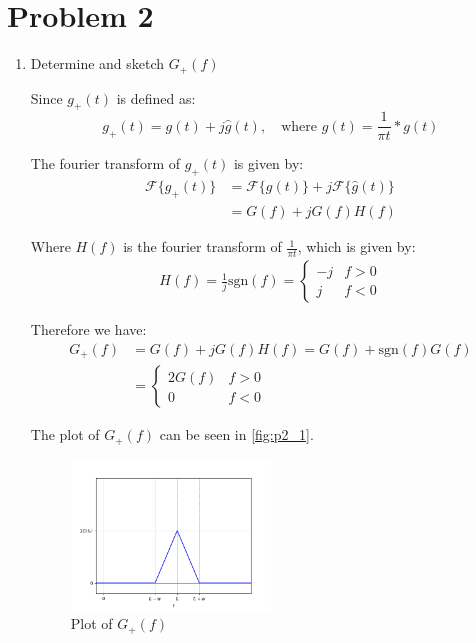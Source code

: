 \documentclass{article}
\begin{document}
\newpage
\newpage
\section{Problem 2}

\begin{enumerate}[label=2.\arabic*]
    \item Determine and sketch $G_+(f)$

    Since $g_+(t)$ is defined as:
    \[
        g_+(t) = g(t) + j\hat{g}(t), \quad \text{where } \hat{g}(t) = \frac{1}{\pi t} \ast g(t)
    \]

    The fourier transform of $g_+(t)$ is given by:
    \begin{align*}
        \mathcal{F}\{g_+(t)\} &= \mathcal{F}\{g(t)\} + j\mathcal{F}\{\hat{g}(t)\} \\
        &= G(f) + jG(f)H(f)
\end{align*}

Where $H(f)$ is the fourier transform of $\frac{1}{\pi t}$, which is given by:
\begin{align*}
    H(f) = \frac{1}{j} \text{sgn}(f) = \begin{cases}
        -j & f > 0 \\
        j & f < 0
    \end{cases}
\end{align*}

Therefore we have:
\begin{align*}
        G_+(f) &= G(f) + jG(f)H(f) = G(f) + \text{sgn}(f)G(f) \\
        &= \begin{cases}
            2G(f) & f > 0 \\
            0 & f < 0
        \end{cases}
\end{align*}

The plot of $G_+(f)$ can be seen in \autoref{fig:p2_1}.
\begin{figure}[ht!]
    \centering
    \includegraphics[width=0.5\textwidth]{p2_1.png}
    \caption{Plot of $G_+(f)$}
    \label{fig:p2_1}
\end{figure}


\end{enumerate}
\end{document}
